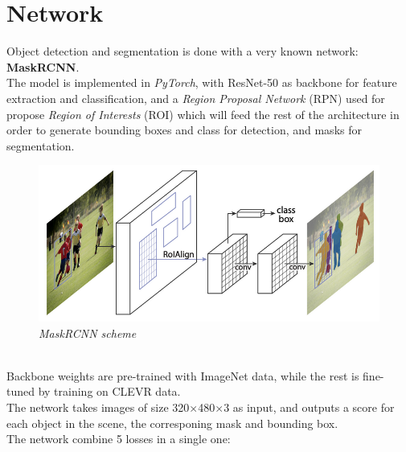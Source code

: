 \documentclass[10pt,twocolumn,letterpaper]{article}
\begin{document}
\section{Network}
  Object detection and segmentation is done with a very known network: \textbf{MaskRCNN}.\\
  The model is implemented in \textit{PyTorch}, with ResNet-50 
  as backbone for feature extraction and classification, and a \textit{Region Proposal Network}
  (RPN) used for propose \textit{Region of Interests} (ROI) which will feed the rest 
  of the architecture in order to
   generate bounding boxes and class for detection, and masks for segmentation.
  \begin{figure}[h] %
    \includegraphics[scale=0.28]{images/mrcnn.png}
    \caption{\textit{MaskRCNN scheme }}
  \end{figure} \\
  Backbone weights are pre-trained with ImageNet data, while the rest is fine-tuned by
  training on CLEVR data.\\
  The network takes images of size 320$\times$480$\times$3 as input,
  and outputs a score for each object in the scene, the corresponing mask and bounding box.\\
  The network combine 5 losses in a single one:
\end{document}
